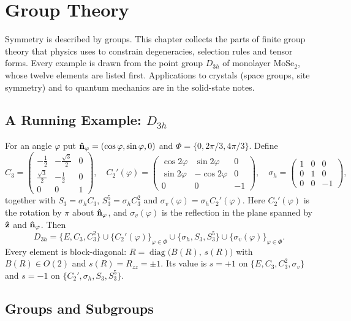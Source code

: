 \chapter{Group Theory}
\label{ch:groups}

Symmetry is described by groups. This chapter collects the parts of finite group theory that physics uses to constrain degeneracies, selection rules and tensor forms. Every example is drawn from the point group $D_{3h}$ of monolayer MoSe$_2$, whose twelve elements are listed first. Applications to crystals (space groups, site symmetry) and to quantum mechanics are in the solid-state notes.

\section{A Running Example: $D_{3h}$}

For an angle $\varphi$ put $\boldsymbol{\hat{\textbf{n}}}_\varphi = (\cos\varphi,\sin\varphi,0)$ and $\Phi = \{0, 2\pi/3, 4\pi/3\}$. Define
\[
    C_3 = \begin{pmatrix} -\tfrac12 & -\tfrac{\sqrt3}{2} & 0\\ \tfrac{\sqrt3}{2} & -\tfrac12 & 0 \\ 0&0&1\end{pmatrix},\quad
    C_2'(\varphi) = \begin{pmatrix} \cos2\varphi & \sin2\varphi & 0\\ \sin2\varphi & -\cos2\varphi & 0 \\ 0&0&-1\end{pmatrix},\quad
    \sigma_h = \begin{pmatrix} 1&0&0\\0&1&0\\0&0&-1\end{pmatrix},
\]
together with $S_3 = \sigma_hC_3$, $S_3^5 = \sigma_hC_3^2$ and $\sigma_v(\varphi) = \sigma_hC_2'(\varphi)$. Here $C_2'(\varphi)$ is the rotation by $\pi$ about $\boldsymbol{\hat{\textbf{n}}}_\varphi$, and $\sigma_v(\varphi)$ is the reflection in the plane spanned by $\boldsymbol{\hat{\textbf{z}}}$ and $\boldsymbol{\hat{\textbf{n}}}_\varphi$. Then
\[
    D_{3h} = \{E, C_3, C_3^2\}\cup\{C_2'(\varphi)\}_{\varphi\in\Phi}\cup\{\sigma_h, S_3, S_3^5\}\cup\{\sigma_v(\varphi)\}_{\varphi\in\Phi}.
\]
Every element is block-diagonal: $R = \operatorname{diag}\bigl(B(R),\,s(R)\bigr)$ with $B(R)\in O(2)$ and $s(R) = R_{zz} = \pm1$. Its value is $s = +1$ on $\{E, C_3, C_3^2, \sigma_v\}$ and $s=-1$ on $\{C_2', \sigma_h, S_3, S_3^5\}$.

\section{Groups and Subgroups}

